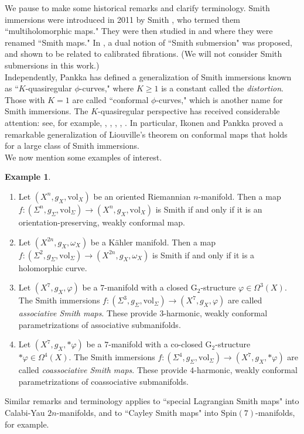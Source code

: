 \documentclass[11pt]{article}
\newcommand{\Spin}{\mathrm{Spin}}
\newcommand{\G}{\mathrm{G}}
\newcommand{\vol}{\mathrm{vol}}
\theoremstyle{definition}
\newtheorem{example}[thm]{Example}
\numberwithin{equation}{section}
\begin{document}
\indent We pause to make some historical remarks and clarify terminology.  Smith immersions were introduced in 2011 by Smith \cite{smith2011theory}, who termed them ``multiholomorphic maps."  They were then studied in \cite{cheng2021bubble} and \cite{cheng2023variational} where they were renamed ``Smith maps."  In \cite{iliashenko2023special}, a dual notion of ``Smith submersion" was proposed, and shown to be related to calibrated fibrations.  (We will not consider Smith submersions in this work.) \\
\indent Independently, Pankka \cite{pankka2020quasiregular} has defined a generalization of Smith immersions known as ``$K$-quasiregular $\phi$-curves," where $K \geq 1$ is a constant called the \emph{distortion}.  Those with $K = 1$ are called ``conformal $\phi$-curves," which is another name for Smith immersions.  The $K$-quasiregular perspective has received considerable attention: see, for example, \cite{heikkila2024quasiregularcohom}, \cite{heikkila2023quasiregular},  \cite{hitruhin2025quasiconformal}, \cite{ikonen2024quasiregular},  \cite{onninen2021quasiregular}.  In particular, Ikonen and Pankka \cite{ikonen2024liouville} proved a remarkable generalization of Liouville's theorem on conformal maps that holds for a large class of Smith immersions. \\
\indent We now mention some examples of interest.



\begin{example} ${}$
\begin{enumerate}
\item Let $(X^n, g_X, \vol_X)$ be an oriented Riemannian $n$-manifold.  Then a map $f \colon (\Sigma^n, g_\Sigma, \vol_\Sigma) \to (X^n, g_X, \vol_X)$ is Smith if and only if it is an orientation-preserving, weakly conformal map.
\item Let $(X^{2n}, g_X, \omega_X)$ be a K\"{a}hler manifold.  Then a map $f \colon (\Sigma^2, g_\Sigma, \vol_\Sigma) \to (X^{2n}, g_X, \omega_X)$ is Smith if and only if it is a holomorphic curve.
\item Let $(X^7, g_X, \varphi)$ be a $7$-manifold with a closed $\G_2$-structure $\varphi \in \Omega^3(X)$.  The Smith immersions $f \colon (\Sigma^3, g_\Sigma, \vol_\Sigma) \to (X^7, g_X, \varphi)$ are called \emph{associative Smith maps}.  These provide $3$-harmonic, weakly conformal parametrizations of associative submanifolds.
\item Let $(X^7, g_X, \ast\varphi)$ be a $7$-manifold with a co-closed $\G_2$-structure $\ast\varphi \in \Omega^4(X)$.  The Smith immersions $f \colon (\Sigma^4, g_\Sigma, \vol_\Sigma) \to (X^7, g_X, \ast \varphi)$ are called \emph{coassociative Smith maps}.  These provide $4$-harmonic, weakly conformal parametrizations of coassociative submanifolds.
\end{enumerate}
Similar remarks and terminology applies to ``special Lagrangian Smith maps" into Calabi-Yau $2n$-manifolds, and to ``Cayley Smith maps" into $\Spin(7)$-manifolds, for example.
\end{example}
\end{document}

